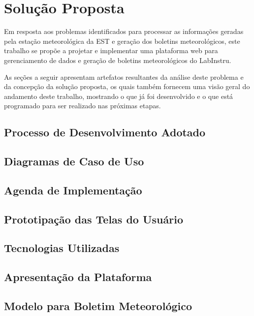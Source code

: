 \chapter{Solução Proposta}

Em resposta aos problemas identificados para processar as informações geradas pela estação meteorológica da EST e geração dos boletins meteorológicos, este trabalho se propõe a projetar e implementar uma plataforma web para gerenciamento de dados e geração de boletins meteorológicos do LabInstru.

As seções a seguir apresentam artefatos resultantes da análise deste problema e da concepção da solução proposta, os quais também fornecem uma visão geral do andamento deste trabalho, mostrando o que já foi desenvolvido e o que está programado para ser realizado nas próximas etapas.

\section{Processo de Desenvolvimento Adotado}


\section{Diagramas de Caso de Uso}


\section{Agenda de Implementação} \label{sec:agenda}


\section{Prototipação das Telas do Usuário}


\section{Tecnologias Utilizadas}


\section{Apresentação da Plataforma}


\section{Modelo para Boletim Meteorológico}
